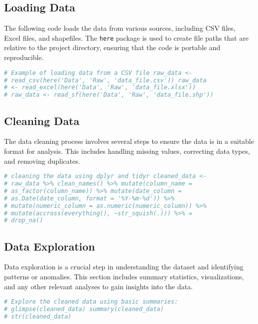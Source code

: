 \documentclass[
  12pt,
]{article}
\newcommand{\passthrough}[1]{#1}
\begin{document}
\subsection{Loading Data}\label{loading-data}

The following code loads the data from various sources, including CSV
files, Excel files, and shapefiles. The \passthrough{\lstinline!here!}
package is used to create file paths that are relative to the project
directory, ensuring that the code is portable and reproducible.

\begin{lstlisting}[language=R]
# Example of loading data from a CSV file raw_data <-
# read_csv(here('Data', 'Raw', 'data_file.csv')) raw_data
# <- read_excel(here('Data', 'Raw', 'data_file.xlsx'))
# raw_data <- read_sf(here('Data', 'Raw', 'data_file.shp'))
\end{lstlisting}

\subsection{Cleaning Data}\label{cleaning-data}

The data cleaning process involves several steps to ensure the data is
in a suitable format for analysis. This includes handling missing
values, correcting data types, and removing duplicates.

\begin{lstlisting}[language=R]
# cleaning the data using dplyr and tidyr cleaned_data <-
# raw_data %>% clean_names() %>% mutate(column_name =
# as_factor(column_name)) %>% mutate(date_column =
# as.Date(date_column, format = '%Y-%m-%d')) %>%
# mutate(numeric_column = as.numeric(numeric_column)) %>%
# mutate(accross(everything(), ~str_squish(.))) %>% =
# drop_na()
\end{lstlisting}

\subsection{Data Exploration}\label{data-exploration}

Data exploration is a crucial step in understanding the dataset and
identifying patterns or anomalies. This section includes summary
statistics, visualizations, and any other relevant analyses to gain
insights into the data.

\begin{lstlisting}[language=R]
# Explore the cleaned data using basic summaries:
# glimpse(cleaned_data) summary(cleaned_data)
# str(cleaned_data)
\end{lstlisting}
\end{document}
